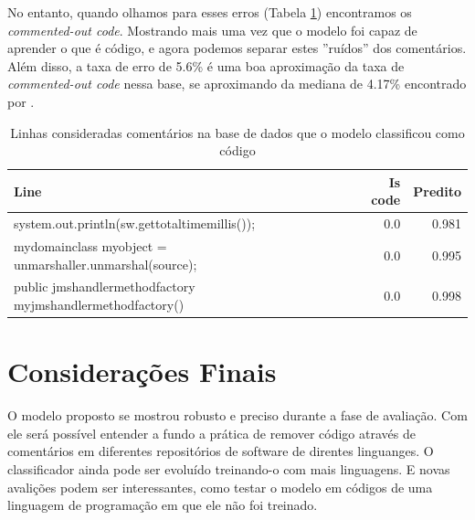 \documentclass[12pt]{article}
\begin{document}
No entanto, quando olhamos para esses erros (Tabela \ref{tab:commentout}) encontramos os 
\textit{commented-out code}. Mostrando mais uma vez que o modelo foi capaz de aprender o 
que é código, e agora podemos separar estes ''ruídos'' dos comentários. Além disso, a taxa 
de erro de 5.6\% é uma boa aproximação da taxa de \textit{commented-out code} nessa base, se
aproximando da mediana de 4.17\% encontrado por \cite{articleMiningComments}. 
\begin{table}[ht]
  \centering
  \caption{Linhas consideradas comentários na base de dados que o modelo classificou como código}
  \label{tab:commentout}
  \begin{tabular}{lrr}
    Line & Is code & Predito\\[0.5ex]
    \hline
    system.out.println(sw.gettotaltimemillis()); & 0.0 & 0.981\\[0.5ex]
    mydomainclass myobject = unmarshaller.unmarshal(source); & 0.0	& 0.995 \\[0.5ex]
    public jmshandlermethodfactory myjmshandlermethodfactory()  & 0.0 & 0.998 \\[0.5ex]
    \hline
  \end{tabular}
\end{table}



\section{Considerações Finais}

O modelo proposto se mostrou robusto e preciso durante a fase de avaliação. 
Com ele será possível entender a fundo a prática de remover código através
de comentários em diferentes repositórios de software de direntes linguanges.
O classificador ainda pode ser evoluído treinando-o com mais linguagens. 
E novas avalições podem ser interessantes, como testar o modelo em códigos 
de uma linguagem de programação em que ele não foi treinado.



\end{document}
